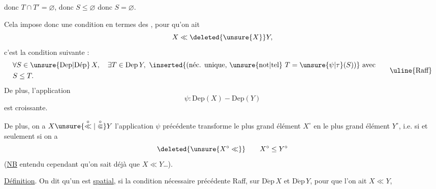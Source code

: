 
donc $T\cap T'=\varnothing$, donc $S\leq\varnothing$ donc $S=\varnothing$.

Cela impose donc une condition  en termes des  , pour qu'on ait
\[
X\ll\deleted{\unsure{X}}Y,
\]
c'est la condition suivante :
\[
\begin{aligned}
&\forall S\in\unsure{\mathrm{Dep}|\mathrm{D\acute{e}p}}\,X,\quad\exists T\in\mathrm{Dep}\,Y,\ \inserted{\text{(néc. unique, \unsure{not|tel} }T=\unsure{\psi|\tau}(S)\text{)}}\ \text{avec}\\
&S\leq T.
\end{aligned}
\tag*{\uline{Raff}}
\]
De plus, l'application
\[
\psi:\mathrm{Dep}(X)\mathbin{-}\mathrm{Dep}(Y)
\]
est croissante.

De plus, on a $X\unsure{\overset{\circ}{\ll}|\overset{\circ}{\Subset}}Y$  l'application $\psi$ précédente transforme le plus grand élément $X^{\circ}$ en le plus grand élément $Y^{\circ}$, i.e. si et seulement si on a
\[
\deleted{\unsure{X^{\circ}\ll}}\qquad X^{\circ}\leq Y^{\circ}
\]
(\uline{NB}  entendu cependant qu'on sait déjà que $X\ll Y$\dots).


\uline{Définition}. On dit qu'un   est \uline{spatial}, si la condition nécessaire précédente Raff, sur $\mathrm{D\acute{e}p}\,X$ et $\mathrm{D\acute{e}p}\,Y$, pour que l'on ait $X\ll Y$,
